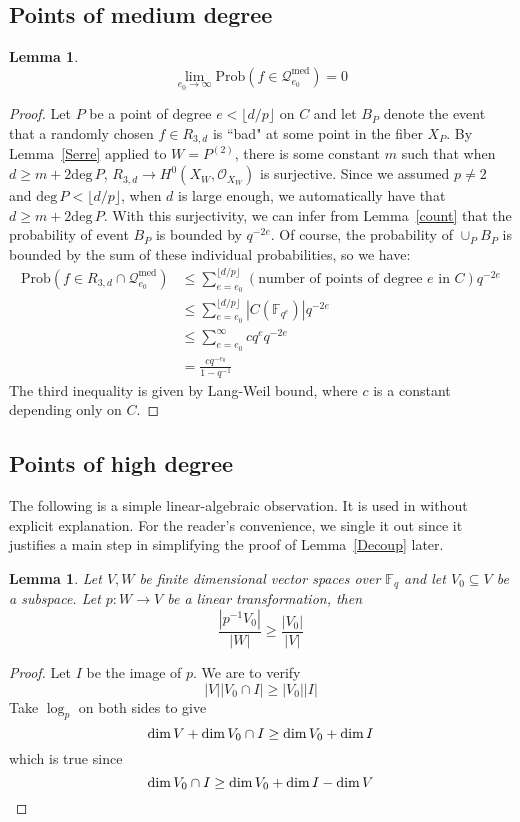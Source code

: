 \documentclass[12pt]{article}
\theoremstyle{plain}
\newtheorem{lemma}[equation]{Lemma}
\theoremstyle{definition}
\newcommand{\IF}{\mathbb{F}}
\newcommand{\sO}{\mathcal{O}}
\newcommand{\sQ}{\mathcal{Q}}
\renewcommand{\deg}{\mathrm{deg}\,}
\renewcommand\dim{{\rm dim\,}}
\newcommand{\<}{\langle}
\renewcommand{\>}{\rangle}
\newcommand{\Prob}{\mathrm{Prob}}
\begin{document}
\subsection{Points of medium degree}
\begin{lemma}
\label{Medium}
$$\lim_{e_0 \to \infty} \Prob( f \in  \sQ_{e_0}^{\mathrm{med}}) = 0 $$
\end{lemma}
\begin{proof}
Let $P$ be a point of degree $e < \lfloor d/p \rfloor$ on $C$ and let $B_P$ denote the event that a randomly chosen $f \in R_{3, d}$ is ``bad" at some point in the fiber $X_P$. By Lemma~\ref{Serre} applied to $W = P^{(2)}$, there is some constant $m$ such that when $d \ge m + 2 \deg P$, $R_{3, d} \to H^0(X_W, \sO_{X_W})$ is surjective. Since we assumed $p \neq 2$ and $\deg P < \lfloor d/p \rfloor$, when $d$ is large enough, we automatically have that $d \ge m + 2 \deg P$. With this surjectivity, we can infer from Lemma~\ref{count} that the probability of event $B_P$ is bounded by $q^{-2e}$. Of course, the probability of $\cup_P B_P$ is bounded by the sum of these individual probabilities, so we have:
\begin{align*}
\Prob(f \in R_{3, d} \cap \sQ_{e_0}^{\mathrm{med}}) &\le \sum_{e = e_0}^{\lfloor d/p \rfloor} (\text{number of points of degree $e$ in $C$})q^{-2e} \\
&\le \sum_{e = e_0}^{\lfloor d/p \rfloor}|C(\IF_{q^e})| q^{-2e} \\
&\le \sum_{e = e_0}^{\infty} c q^{e} q^{-2e} \\
&= \frac{c q^{-e_0}}{1 - q^{-1}}
\end{align*}
The third inequality is given by Lang-Weil bound, where $c$ is a constant depending only on $C$. 
\end{proof}

\subsection{Points of high degree} 
The following is a simple linear-algebraic observation. It is used in \cite{Wood} without explicit explanation. For the reader's convenience, we single it out since it justifies a main step in simplifying the proof of Lemma~\ref{Decoup} later. 
\begin{lemma}
\label{linear}
Let $V, W$ be finite dimensional vector spaces over $\IF_q$ and let $V_0 \subseteq V$ be a subspace. Let $p : W \to V$ be a linear transformation, then 
$$ \frac{|p^{-1} V_0|}{|W|} \ge \frac{|V_0|}{|V|}$$
\end{lemma}
\begin{proof}
Let $I$ be the image of $p$. We are to verify 
$$ |V||V_0 \cap I| \ge |V_0||I| $$
Take $\log_p$ on both sides to give
$$ \dim V  + \dim V_0 \cap I \ge \dim V_0 + \dim I$$
which is true since 
$$ \dim V_0 \cap I \ge \dim V_0 + \dim I - \dim V $$  
\end{proof}
\end{document}
